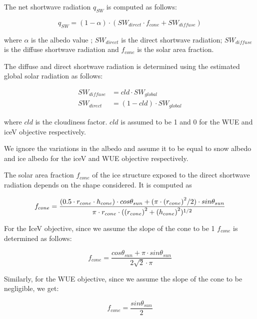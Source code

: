 \documentclass[tc, manuscript]{copernicus}
\begin{document}
The net shortwave radiation $q_{SW}$ is computed as follows:

\begin{equation} q_{SW} = (1- \alpha) \cdot ( SW_{direct} \cdot f_{cone} + SW_{diffuse})
\label{eqn:SW} \end{equation}

where $\alpha$ is the albedo value ; $SW_{direct}$ is the direct shortwave radiation; $SW_{diffuse}$ is the
diffuse shortwave radiation and $f_{cone}$ is the solar area fraction.

The diffuse and direct shortwave radiation is determined using the estimated global solar radiation as follows:

\begin{equation}
\begin{split}
  SW_{diffuse} &= cld \cdot SW_{global}\\
  SW_{direct} &= (1-cld) \cdot SW_{global}
\end{split}
\end{equation}

where $cld$ is the cloudiness factor. $cld$ is assumed to be 1 and 0 for the WUE and iceV objective
respectively.

We ignore the variations in the albedo and assume it to be equal to snow albedo and ice albedo for the iceV and
WUE objective respectively. 

The solar area fraction $f_{cone}$ of the ice structure exposed to the direct shortwave radiation depends on the
shape considered. It is computed as

\begin{equation}
		f_{cone} =\frac{(0.5 \cdot r_{cone} \cdot h_{cone}) \cdot cos \theta_{sun} +(\pi \cdot
			{(r_{cone})}^2/2) \cdot sin \theta_{sun} }{\pi \cdot r_{cone} \cdot ({(r_{cone})}^2+{(h_{cone})}^2)^{1/2}}\\
\end{equation}

For the IceV objective, since we assume the slope of the cone to be 1 $f_{cone}$ is determined
as follows:

\begin{equation}
		f_{cone} =\frac{ cos \theta_{sun} + \pi \cdot sin \theta_{sun} }{2\sqrt{2} \cdot \pi }
\end{equation}

Similarly, for the WUE objective, since we assume the slope of the cone to be negligible, we get:

\begin{equation}
		f_{cone} =\frac{ sin \theta_{sun} }{2 }
\end{equation}
\end{document}
